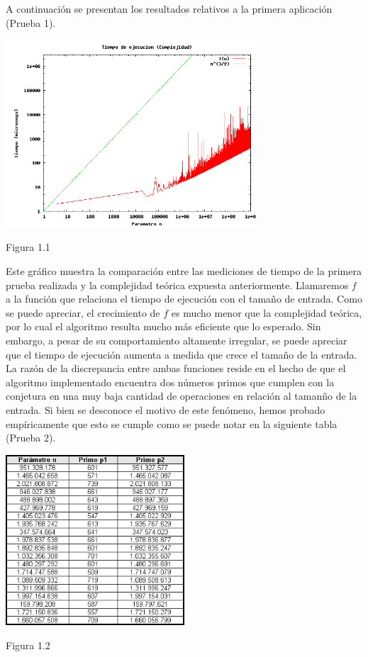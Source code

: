 \documentclass[a4paper,10pt] {article}
\begin{document}
A continuaci\'on se presentan los resultados relativos a la primera aplicaci\'on (Prueba 1).

\begin{center}
 \includegraphics[width=0.7\textwidth]{Plots/Ej1-Complejidad.png}
\begin{center}
Figura 1.1
\end{center}
\end{center}

Este gr\'afico muestra la comparaci\'on entre las mediciones de tiempo de la primera prueba realizada y la complejidad te\'orica expuesta anteriormente. Llamaremos $f$ a la funci\'on que relaciona el tiempo de ejecuci\'on con el tama\~{n}o de entrada. Como se puede apreciar, el crecimiento de $f$ es mucho menor que la complejidad te\'orica, por lo cual el algoritmo resulta mucho m\'as eficiente que lo esperado. Sin embargo, a pesar de su comportamiento altamente irregular, se puede apreciar que el tiempo de ejecuci\'on aumenta a medida que crece el tama\~{n}o de la entrada. La raz\'on de la discrepancia entre ambas funciones reside en el hecho de que el algoritmo implementado encuentra dos n\'umeros primos que cumplen con la conjetura en una muy baja cantidad de operaciones en relaci\'on al taman\~{n}o de la entrada. Si bien se desconoce el motivo de este fen\'omeno, hemos probado emp\'iricamente que esto se cumple como se puede notar en la siguiente tabla (Prueba 2).

\begin{center}
 \includegraphics[width=0.5\textwidth]{Plots/Ej1-MayoresPrimos.png}
\begin{center}
Figura 1.2
\end{center}
\end{center}
\end{document}

